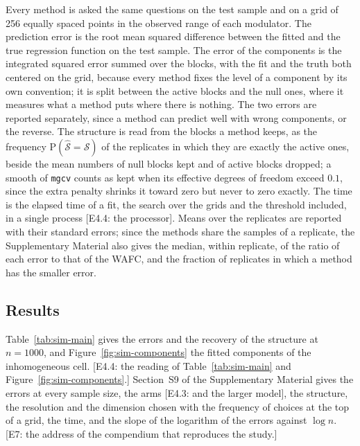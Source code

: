 \documentclass[12pt]{article} %
\theoremstyle{definition}
\theoremstyle{plain}
\newcommand{\Prob}{\mathrm{P}}
\begin{document}
{Every method is asked the same questions on the test sample and on a grid of
256 equally spaced points in the observed range of each modulator. The
prediction error is the root mean squared difference between the fitted and
the true regression function on the test sample. The error of the components
is the integrated squared error summed over the blocks, with the fit and the
truth both centered on the grid, because every method fixes the level of a
component by its own convention; it is split between the active blocks and
the null ones, where it measures what a method puts where there is nothing.
The two errors are reported separately, since a method can predict well with
wrong components, or the reverse. The structure is read from the blocks a
method keeps, as the frequency $\Prob(\widehat{\mathcal{S}} = \mathcal{S})$ of
the replicates in which they are exactly the active ones, beside the mean
numbers of null blocks kept and of active blocks dropped; a smooth of
\texttt{mgcv} counts as kept when its effective degrees of freedom exceed
$0.1$, since the extra penalty shrinks it toward zero but never to zero
exactly. The time is the elapsed time of a fit, the search over the grids and
the threshold included, in a single process [E4.4: the processor]. Means over
the replicates are reported with their standard errors; since the methods
share the samples of a replicate, the Supplementary Material also gives the
median, within replicate, of the ratio of each error to that of the WAFC, and
the fraction of replicates in which a method has the smaller error.

\subsection{Results}
\label{sec:sim-results}

Table~\ref{tab:sim-main} gives the errors and the recovery of the structure at
$n = 1000$, and Figure~\ref{fig:sim-components} the fitted components of the
inhomogeneous cell. [E4.4: the reading of Table~\ref{tab:sim-main} and
Figure~\ref{fig:sim-components}.] Section~S9 of the Supplementary Material
gives the errors at every sample size, the arms [E4.3: and the larger model],
the structure, the resolution and the dimension chosen with the frequency of
choices at the top of a grid, the time, and the slope of the logarithm of the
errors against $\log n$. [E7: the address of the compendium that reproduces
the study.]



}
\end{document}
